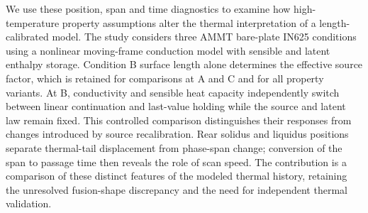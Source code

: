 We use these position, span and time diagnostics to examine how high-temperature property assumptions alter the thermal interpretation of a length-calibrated model. The study considers three AMMT bare-plate IN625 conditions~\cite{lane2020,nist2018} using a nonlinear moving-frame conduction model with sensible and latent enthalpy storage. Condition B surface length alone determines the effective source factor, which is retained for comparisons at A and C and for all property variants. At B, conductivity and sensible heat capacity independently switch between linear continuation and last-value holding while the source and latent law remain fixed. This controlled comparison distinguishes their responses from changes introduced by source recalibration. Rear solidus and liquidus positions separate thermal-tail displacement from phase-span change; conversion of the span to passage time then reveals the role of scan speed. The contribution is a comparison of these distinct features of the modeled thermal history, retaining the unresolved fusion-shape discrepancy and the need for independent thermal validation.

